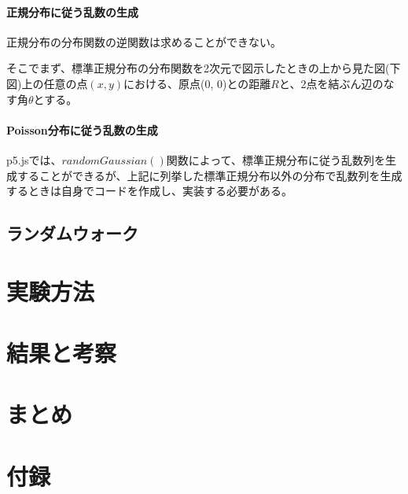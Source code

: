 \documentclass[dvipdfmx]{jsarticle}
\begin{document}
\paragraph{正規分布に従う乱数の生成}
正規分布の分布関数の逆関数は求めることができない。\par
そこでまず、標準正規分布の分布関数を2次元で図示したときの上から見た図(下図)上の任意の点$(x,y)$における、原点(0, 0)との距離$R$と、2点を結ぶん辺のなす角$\theta$とする。

\paragraph{Poisson分布に従う乱数の生成}
p5.jsでは、$randomGaussian()$関数によって、標準正規分布に従う乱数列を生成することができるが、上記に列挙した標準正規分布以外の分布で乱数列を生成するときは自身でコードを作成し、実装する必要がある。


\subsection{ランダムウォーク}

\section{実験方法}
\section{結果と考察}
\section{まとめ}
\section{付録}
\end{document}
